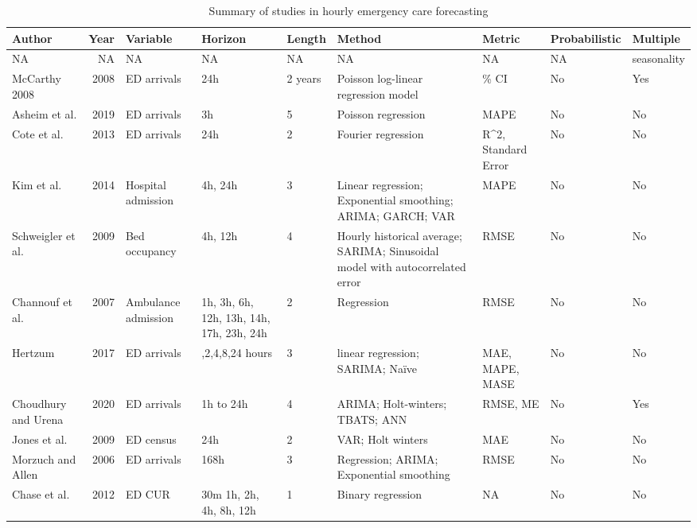 \documentclass[]{elsarticle} %
\begin{document}
\begin{table}[!h]

\caption{\label{tab:summarylit}Summary of studies in hourly emergency care forecasting}
\centering
\fontsize{11}{13}\selectfont
\begin{tabular}[t]{lr>{\raggedright\arraybackslash}p{6em}>{\raggedright\arraybackslash}p{4em}l>{\raggedright\arraybackslash}p{15em}>{\raggedright\arraybackslash}p{4em}ll}
\toprule
Author & Year & Variable & Horizon & Length & Method & Metric & Probabilistic & Multiple\\
\midrule
NA & NA & NA & NA & NA & NA & NA & NA & seasonality\\
McCarthy 
2008 & 2008 & ED arrivals & 24h & 2 years & Poisson log-linear regression model & 95\% CI & No & Yes\\
Asheim et al. & 2019 & ED arrivals & 3h & 5 & Poisson regression & MAPE & No & No\\
Cote et al. & 2013 & ED arrivals & 24h & 2 & Fourier regression & R\textasciicircum{}2,  Standard Error & No & No\\
Kim et al. & 2014 & Hospital admission & 4h, 24h & 3 & Linear regression; Exponential smoothing; ARIMA; GARCH; VAR & MAPE & No & No\\
Schweigler et al. & 2009 & Bed occupancy & 4h, 12h & 4 & Hourly historical average; SARIMA; Sinusoidal model with autocorrelated error & RMSE & No & No\\
Channouf et al. & 2007 & Ambulance admission & 1h, 3h, 6h, 12h, 13h, 14h, 17h, 23h, 24h & 2 & Regression & RMSE & No & No\\
Hertzum & 2017 & ED arrivals & 1,2,4,8,24 hours & 3 & linear regression; SARIMA; Naïve & MAE, MAPE, 
MASE & No & No\\
Choudhury and Urena & 2020 & ED arrivals & 1h to 24h & 4 & ARIMA; Holt-winters; TBATS; ANN & RMSE, ME & No & Yes\\
Jones et al. & 2009 & ED census & 24h & 2 & VAR;  Holt winters & MAE & No & No\\
Morzuch and Allen & 2006 & ED arrivals & 168h & 3 & Regression; ARIMA; Exponential smoothing & RMSE & No & No\\
Chase et al. & 2012 & ED CUR & 30m
1h, 2h, 4h, 8h, 12h & 1 & Binary regression & NA & No & No\\
\bottomrule
\end{tabular}
\end{table}
\end{document}
